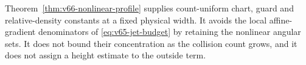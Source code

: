 Theorem~\ref{thm:v66-nonlinear-profile} supplies count-uniform chart,
guard and relative-density constants at a fixed physical width. It
avoids the local affine-gradient denominators of
\eqref{eq:v65-jet-budget} by retaining the nonlinear angular sets.
It does not bound their concentration as the collision count grows,
and it does not assign a height estimate to the outside term.
